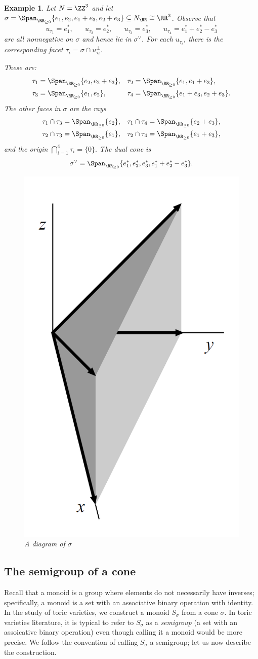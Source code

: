 \documentclass[12pt]{amsart}
\theoremstyle{plain}
\newtheorem{example}[theorem]{Example}
\begin{document}
\begin{example}\label{coneanddualexample}
Let $N = \ZZ^3$ and let $\sigma = \Span_{\RR_{\ge 0}}\{ e_1, e_2, e_1+e_3, e_2 + e_3\} \subseteq N_\RR \cong \RR^3$.
Observe that 
$$u_{\tau_1} = e_1^*, \,\,\,\,\,\,\,\,\,\, u_{\tau_2} = e_2^*, \,\,\,\,\,\,\,\,\,\, u_{\tau_3} = e_3^*, \,\,\,\,\,\,\,\,\,\, u_{\tau_4} = e_1^* + e_2^* - e_3^*$$
are all nonnegative on $\sigma$ and hence lie in $\sigma^\vee$. 
For each $u_{\tau_i}$, there is the corresponding facet $\tau_i = \sigma \cap u_{\tau_i}^\perp$.

These are:
\begin{align*}
	&\tau_1 = \Span_{\RR_{\ge 0}}\{e_2, e_2+e_3\}, & &\tau_2 = \Span_{\RR_{\ge 0}} \{e_1, e_1+e_3\}, \\
	&\tau_3 = \Span_{\RR_{\ge 0}}\{e_1, e_2\},  & &\tau_4 = \Span_{\RR_{\ge 0}} \{e_1+e_3, e_2+e_3\}.
\end{align*}
The other faces in $\sigma$ are the rays 
\begin{align*}
	&\tau_1 \cap \tau_3 = \Span_{\RR_{\ge 0}}\{e_2\}, & &\tau_1 \cap \tau_4 = \Span_{\RR_{\ge 0}} \{e_2+e_3\}, \\
	&\tau_2 \cap \tau_3 = \Span_{\RR_{\ge 0}}\{e_1\}, & &\tau_2 \cap \tau_4 = \Span_{\RR_{\ge 0}} \{e_1+e_3\},
\end{align*}
and the origin $\bigcap_{i=1}^4 \tau_i = \{0\}.$
The dual cone is
$$\sigma^\vee = \Span_{\RR_{\ge 0}} \{e_1^*, e_2^*, e_3^*, e_1^* +e_2^* - e_3^*\}.$$

\begin{figure}[H]
\includegraphics[width=0.2 \textwidth]{../images/cox cone example 2}
\caption*{A diagram of $\sigma$ \cite[Figure 2]{CLS11}}
\end{figure}

\end{example}

\subsection{The semigroup of a cone}
Recall that a monoid is a group where elements do not necessarily have inverses;
specifically, a monoid is a set with an associative binary operation with identity.
In the study of toric varieties, we construct a monoid $S_\sigma$ from a cone $\sigma$.
In toric varieties literature, it is typical to refer to $S_\sigma$ as a \emph{semigroup} (a set with an assoicative binary operation) even though calling it a monoid would be more precise.
We follow the convention of calling $S_\sigma$ a semigroup; let us now describe the construction.
\end{document}
